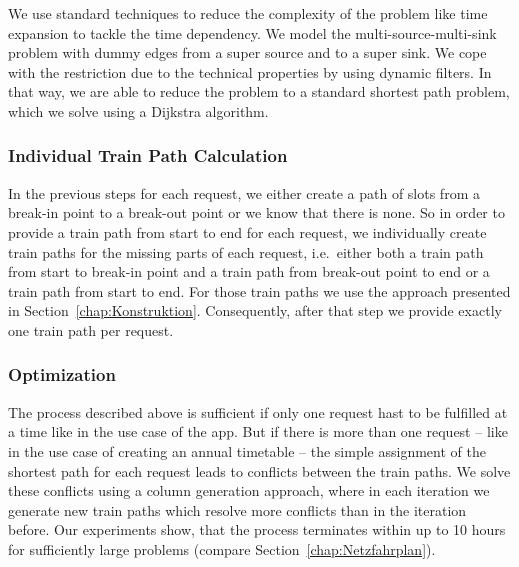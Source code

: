 We use standard techniques to reduce the complexity of the problem like time expansion to tackle the time dependency. We model the multi-source-multi-sink problem with dummy edges from a super source and to a super sink. We cope with the restriction due to the technical properties by using dynamic filters. In that way, we are able to reduce the problem to a standard shortest path problem, which we solve using a Dijkstra algorithm.

\subsubsection{Individual Train Path Calculation}
In the previous steps for each request, we either create a path of slots from a break-in point to a break-out point or we know that there is none. So in order to provide a train path from start to end for each request, we individually create train paths for the missing parts of each request, i.e.\ either both a train path from start to break-in point and a train path from break-out point to end or a train path from start to end. For those train paths we use the approach presented in Section~\ref{chap:Konstruktion}. Consequently, after that step we provide exactly one train path per request.

\subsubsection{Optimization}
The process described above is sufficient if only one request hast to be fulfilled at a time like in the use case of the app. But if there is more than one request -- like in the use case of creating an annual timetable -- the simple assignment of the shortest path for each request leads to conflicts between the train paths. We solve these conflicts using a column generation approach, where in each iteration we generate new train paths which resolve more conflicts than in the iteration before. Our experiments show, that the process terminates within up to 10 hours for sufficiently large problems (compare Section~\ref{chap:Netzfahrplan}).